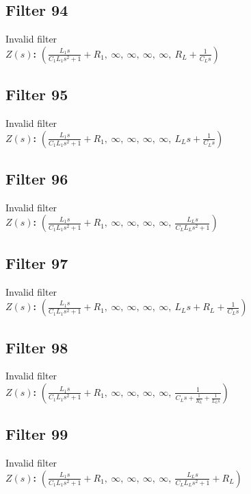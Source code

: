 \documentclass{article}
\begin{document}
\subsection*{Filter 94}
Invalid filter \\ 
\textbf{$Z(s)$:} $\left( \frac{L_{1} s}{C_{1} L_{1} s^{2} + 1} + R_{1}, \  \infty, \  \infty, \  \infty, \  \infty, \  R_{L} + \frac{1}{C_{L} s}\right)$ \\ 
\subsection*{Filter 95}
Invalid filter \\ 
\textbf{$Z(s)$:} $\left( \frac{L_{1} s}{C_{1} L_{1} s^{2} + 1} + R_{1}, \  \infty, \  \infty, \  \infty, \  \infty, \  L_{L} s + \frac{1}{C_{L} s}\right)$ \\ 
\subsection*{Filter 96}
Invalid filter \\ 
\textbf{$Z(s)$:} $\left( \frac{L_{1} s}{C_{1} L_{1} s^{2} + 1} + R_{1}, \  \infty, \  \infty, \  \infty, \  \infty, \  \frac{L_{L} s}{C_{L} L_{L} s^{2} + 1}\right)$ \\ 
\subsection*{Filter 97}
Invalid filter \\ 
\textbf{$Z(s)$:} $\left( \frac{L_{1} s}{C_{1} L_{1} s^{2} + 1} + R_{1}, \  \infty, \  \infty, \  \infty, \  \infty, \  L_{L} s + R_{L} + \frac{1}{C_{L} s}\right)$ \\ 
\subsection*{Filter 98}
Invalid filter \\ 
\textbf{$Z(s)$:} $\left( \frac{L_{1} s}{C_{1} L_{1} s^{2} + 1} + R_{1}, \  \infty, \  \infty, \  \infty, \  \infty, \  \frac{1}{C_{L} s + \frac{1}{R_{L}} + \frac{1}{L_{L} s}}\right)$ \\ 
\subsection*{Filter 99}
Invalid filter \\ 
\textbf{$Z(s)$:} $\left( \frac{L_{1} s}{C_{1} L_{1} s^{2} + 1} + R_{1}, \  \infty, \  \infty, \  \infty, \  \infty, \  \frac{L_{L} s}{C_{L} L_{L} s^{2} + 1} + R_{L}\right)$ \\ 
\end{document}
